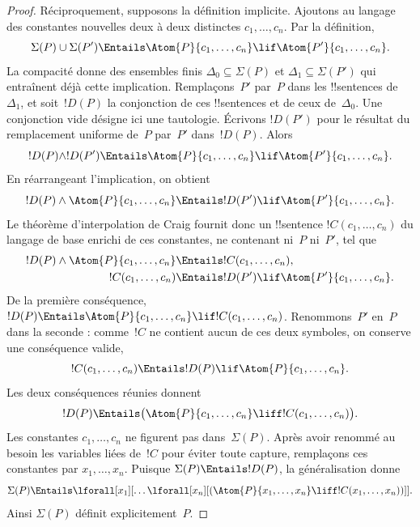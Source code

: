 \documentclass[../../../include/open-logic-section]{subfiles}
\begin{document}
\begin{proof}
Réciproquement, supposons la
définition implicite. Ajoutons au
langage des constantes nouvelles deux à deux distinctes
$c_1,\dots,c_n$. Par la définition,
\[
\Sigma(P)\cup\Sigma(P')\Entails
  \Atom{P}{c_1,\dots,c_n}
  \lif\Atom{P'}{c_1,\dots,c_n}.
\]
La compacité donne des ensembles
finis $\Delta_0\subseteq\Sigma(P)$
et $\Delta_1\subseteq\Sigma(P')$
qui entraînent déjà cette
implication. Remplaçons~$P'$ par~$P$
dans les !!{sentence}s de $\Delta_1$,
et soit~$!D(P)$ la conjonction
de ces !!{sentence}s et de ceux
de~$\Delta_0$. Une conjonction
vide désigne ici une tautologie.
Écrivons $!D(P')$ pour le résultat
du remplacement uniforme de~$P$
par~$P'$ dans~$!D(P)$. Alors
\[
!D(P)\land !D(P')\Entails
  \Atom{P}{c_1,\dots,c_n}
  \lif\Atom{P'}{c_1,\dots,c_n}.
\]
En réarrangeant l'implication,
on obtient
\[
!D(P)\land\Atom{P}{c_1,\dots,c_n}
  \Entails
!D(P')\lif\Atom{P'}{c_1,\dots,c_n}.
\]
Le théorème d'interpolation de Craig
fournit donc un !!{sentence}
$!C(c_1,\dots,c_n)$ du langage de
base enrichi de ces constantes,
ne contenant ni~$P$ ni~$P'$, tel que
\begin{align*}
!D(P)\land\Atom{P}{c_1,\dots,c_n}
  &\Entails !C(c_1,\dots,c_n),\\
!C(c_1,\dots,c_n)
  &\Entails !D(P')\lif
    \Atom{P'}{c_1,\dots,c_n}.
\end{align*}
De la première conséquence,
$!D(P)\Entails\Atom{P}{c_1,\dots,c_n}
\lif !C(c_1,\dots,c_n)$.
Renommons~$P'$ en~$P$ dans la
seconde : comme~$!C$ ne contient
aucun de ces deux symboles,
on conserve une conséquence valide,
\[
!C(c_1,\dots,c_n)\Entails
  !D(P)\lif\Atom{P}{c_1,\dots,c_n}.
\]
Les deux conséquences réunies
donnent
\[
!D(P)\Entails\bigl(
  \Atom{P}{c_1,\dots,c_n}
  \liff !C(c_1,\dots,c_n)\bigr).
\]
Les constantes $c_1,\dots,c_n$
ne figurent pas dans~$\Sigma(P)$.
Après avoir renommé au besoin les
variables liées de~$!C$ pour éviter
toute capture, remplaçons ces
constantes par $x_1,\dots,x_n$.
Puisque $\Sigma(P)\Entails !D(P)$,
la généralisation donne
\[
\Sigma(P)\Entails
  \lforall[x_1][\dots\lforall[x_n]
  [(\Atom{P}{x_1,\dots,x_n}
  \liff !C(x_1,\dots,x_n))]].
\]
Ainsi $\Sigma(P)$ définit
explicitement~$P$.
\end{proof}
\end{document}
